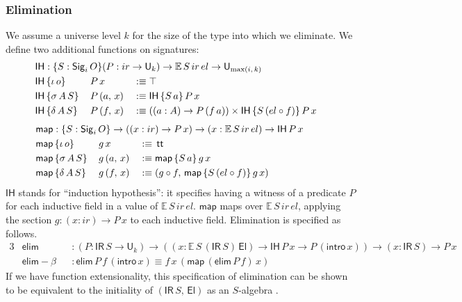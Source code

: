 \documentclass[acmsmall,screen,review,anonymous]{acmart}
\newcommand{\msf}[1]{{\mathsf{#1}}}
\newcommand{\mbb}[1]{\mathbb{#1}}
\newcommand{\U}{\msf{U}}
\newcommand{\El}{\msf{El}}
\newcommand{\Sig}{\msf{Sig}}
\newcommand{\ttt}{\msf{tt}}
\newcommand{\ir}{{ir}}
\newcommand{\el}{{el}}
\newcommand{\IR}{\msf{IR}}
\newcommand{\intro}{\msf{intro}}
\newcommand{\IH}{\msf{IH}}
\newcommand{\map}{\msf{map}}
\newcommand{\elim}{\msf{elim}}
\newcommand{\E}{\mbb{E}}
\begin{document}
\subsubsection{Elimination}\label{sec:ir-elimination}

We assume a universe level $k$ for the size of the type into which we eliminate. We define two
additional functions on signatures:
\begin{alignat*}{3}
  &\rlap{$\IH : \{S : \Sig_i\,O\}(P : \ir \to \U_k) \to \E\,S\,\ir\,\el \to \U_{\max(i,\,k)}$} \\
  &\IH\,\{\iota\,o\}    \,&&P\,x       &&:\equiv \top \\
  &\IH\,\{\sigma\,A\,S\}\,&&P\,(a,\,x) &&:\equiv \IH\,\{S\,a\}\,P\,x\\
  &\IH\,\{\delta\,A\,S\}\,&&P\,(f,\,x) &&:\equiv ((a : A) \to P\,(f\,a)) \times \IH\,\{S\,(\el \circ f)\}\,P\,x
\end{alignat*}
\begin{alignat*}{3}
  &\hspace{-4.8em}\rlap{$\map : \{S : \Sig_i\,O\} \to ((x : \ir) \to P\,x) \to (x : \E\,S\,\ir\,\el) \to \IH\,P\,x$} \\
  &\hspace{-4.8em}\map\,\{\iota\,o\}    \,&&g\,x       &&:\equiv\,\ttt \\
  &\hspace{-4.8em}\map\,\{\sigma\,A\,S\}\,&&g\,(a,\,x) &&:\equiv \map\,\{S\,a\}\,g\,x\\
  &\hspace{-4.8em}\map\,\{\delta\,A\,S\}\,&&g\,(f,\,x) &&:\equiv (g \circ f,\,\map\,\{S\,(\el \circ f)\}\,g\,x)
\end{alignat*}
$\IH$ stands for ``induction hypothesis'': it specifies having a witness of a predicate $P$ for
each inductive field in a value of $\E\,S\,\ir\,\el$. $\map$ maps over $\E\,S\,\ir\,\el$, applying the
section $g : (x : \ir) \to P\,x$ to each inductive field. Elimination is specified as follows.
\begin{alignat*}{3}
  &\elim           &&: (P : \IR\,S \to \U_k) \to ((x : \E\,S\,(\IR\,S)\,\El) \to \IH\,P\,x \to P\,(\intro\,x)) \to (x : \IR\,S) \to P\,x \\
  &\elim\!-\!\!\beta &&: \elim\,P\,f\,(\intro\,x) \equiv f\,x\,(\map\,(\elim\,P\,f)\,x)
\end{alignat*}
If we have function extensionality, this specification of elimination can be shown to be equivalent
to the initiality of $(\IR\,S,\,\El)$ as an $S$-algebra \cite[Section~4.4]{DBLP:journals/apal/DybjerS03}.
\end{document}
